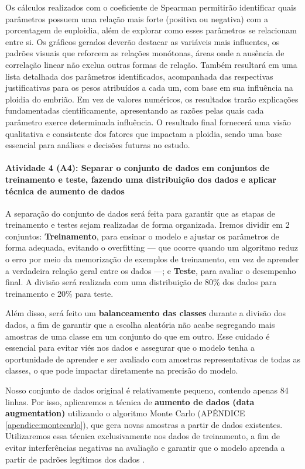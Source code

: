 Os cálculos realizados com o coeficiente de Spearman permitirão identificar quais parâmetros possuem uma relação mais forte (positiva ou negativa) com a porcentagem de euploidia, além de explorar como esses parâmetros se relacionam entre si. Os gráficos gerados deverão destacar as variáveis mais influentes, os padrões visuais que reforcem as relações monótonas, áreas onde a ausência de correlação linear não exclua outras formas de relação. Também resultará em uma lista detalhada dos parâmetros identificados, acompanhada das respectivas justificativas para os pesos atribuídos a cada um, com base em sua influência na ploidia do embrião. Em vez de valores numéricos, os resultados trarão explicações fundamentadas cientificamente, apresentando as razões pelas quais cada parâmetro exerce determinada influência. O resultado final fornecerá uma visão qualitativa e consistente dos fatores que impactam a ploidia, sendo uma base essencial para análises e decisões futuras no estudo.

\paragraph{\textbf{Atividade 4 (A4):} Separar o conjunto de dados em conjuntos de treinamento e teste, fazendo uma distribuição dos dados e aplicar técnica de aumento de dados}

A separação do conjunto de dados será feita para garantir que as etapas de treinamento e testes sejam realizadas de forma organizada. Iremos dividir em 2 conjuntos: \textbf{Treinamento}, para ensinar o modelo e ajustar os parâmetros de forma adequada, evitando o overfitting — que ocorre quando um algoritmo reduz o erro por meio da memorização de exemplos de treinamento, em vez de aprender a verdadeira relação geral entre os dados \cite{bashir2020} —; e \textbf{Teste}, para avaliar o desempenho final. A divisão será realizada com uma distribuição de 80\% dos dados para treinamento e 20\% para teste.

Além disso, será feito um \textbf{balanceamento das classes} durante a divisão dos dados, a fim de garantir que a escolha aleatória não acabe segregando mais amostras de uma classe em um conjunto do que em outro. Esse cuidado é essencial para evitar viés nos dados e assegurar que o modelo tenha a oportunidade de aprender e ser avaliado com amostras representativas de todas as classes, o que pode impactar diretamente na precisão do modelo.

Nosso conjunto de dados original é relativamente pequeno, contendo apenas 84 linhas. Por isso, aplicaremos a técnica de \textbf{aumento de dados (data augmentation)} utilizando o algoritmo Monte Carlo (APÊNDICE \ref{apendice:montecarlo}), que gera novas amostras a partir de dados existentes. Utilizaremos essa técnica exclusivamente nos dados de treinamento, a fim de evitar interferências negativas na avaliação e garantir que o modelo aprenda a partir de padrões legítimos dos dados \cite{kiar2021}.

